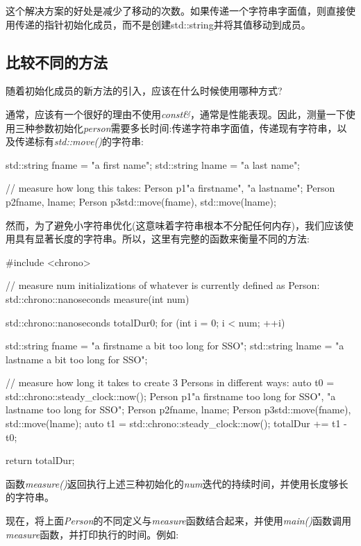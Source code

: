 这个解决方案的好处是减少了移动的次数。如果传递一个字符串字面值，则直接使用传递的指针初始化成员，而不是创建std::string并将其值移动到成员。

\subsection{比较不同的方法}

随着初始化成员的新方法的引入，应该在什么时候使用哪种方式?

通常，应该有一个很好的理由不使用\textit{const\&}，通常是性能表现。因此，测量一下使用三种参数初始化\textit{person}需要多长时间:传递字符串字面值，传递现有字符串，以及传递标有\textit{std::move()}的字符串:

\begin{cppcode}
std::string fname = "a first name";
std::string lname = "a last name";

// measure how long this takes:
Person p1{"a firstname", "a lastname"};
Person p2{fname, lname};
Person p3{std::move(fname), std::move(lname)};
\end{cppcode}

然而，为了避免小字符串优化(这意味着字符串根本不分配任何内存)，我们应该使用具有显著长度的字符串。所以，这里有完整的函数来衡量不同的方法:

\begin{cppcode}
#include <chrono>

// measure num initializations of whatever is currently defined as Person:
std::chrono::nanoseconds measure(int num)
{
	std::chrono::nanoseconds totalDur{0};
	for (int i = 0; i < num; ++i) {
		std::string fname = "a firstname a bit too long for SSO";
		std::string lname = "a lastname a bit too long for SSO";
		
		// measure how long it takes to create 3 Persons in different ways:
		auto t0 = std::chrono::steady_clock::now();
		Person p1{"a firstname too long for SSO", "a lastname too long for SSO"};
		Person p2{fname, lname};
		Person p3{std::move(fname), std::move(lname)};
		auto t1 = std::chrono::steady_clock::now();
		totalDur += t1 - t0;
	}
	return totalDur;
}
\end{cppcode}

函数\textit{measure()}返回执行上述三种初始化的\textit{num}迭代的持续时间，并使用长度够长的字符串。

现在，将上面\textit{Person}的不同定义与\textit{measure}函数结合起来，并使用\textit{main()}函数调用\textit{measure}函数，并打印执行的时间。例如:


